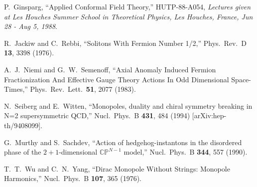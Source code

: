 \documentclass[a4paper,12pt, amsfonts, amssymb]{article}
\newcommand{\CC}{{\mathbb C}}
\newcommand{\PP}{{\mathbb P}}
\begin{document}
\begin{thebibliography}{99}
P.~Ginsparg,
``Applied Conformal Field Theory,'' HUTP-88-A054,
{\it Lectures given at Les Houches Summer School in Theoretical Physics, Les Houches, France, Jun 28 - Aug 5, 1988}.

R.~Jackiw and C.~Rebbi, ``Solitons With Fermion Number 1/2,''
Phys.\ Rev.\ D {\bf 13}, 3398 (1976).

A.~J.~Niemi and G.~W.~Semenoff,
``Axial Anomaly Induced Fermion Fractionization And Effective Gauge Theory Actions In Odd Dimensional Space-Times,''
Phys.\ Rev.\ Lett.\  {\bf 51}, 2077 (1983).

N.~Seiberg and E.~Witten,
``Monopoles, duality and chiral symmetry breaking in N=2 
supersymmetric QCD,'' Nucl.\ Phys.\ B {\bf 431}, 484 (1994)
[arXiv:hep-th/9408099].

G.~Murthy and S.~Sachdev, ``Action of hedgehog-instantons in the disordered phase of the $2+1$-dimensional
$\CC\PP^{N-1}$ model,'' Nucl.\ Phys.\ B {\bf 344}, 557 (1990).

T.~T.~Wu and C.~N.~Yang, ``Dirac Monopole Without Strings: Monopole
Harmonics,'' Nucl.\ Phys.\ B {\bf 107}, 365 (1976).






\end{thebibliography}
\end{document}

